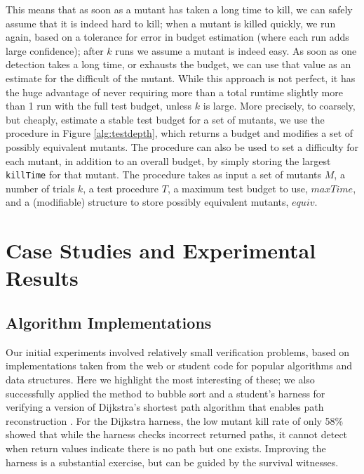 \documentclass{svjour3}
\begin{document}
This means that as soon as a mutant has taken a long time to kill, we
can safely assume that it is indeed hard to kill; when a mutant is killed
quickly, we run again, based on a tolerance for error in budget
estimation (where each run adds large confidence); after $k$ runs we
assume a mutant is indeed easy.  As soon as one
detection takes a long time, or exhausts the budget, we can use that
value as an estimate for the difficult of the mutant.  While this
approach is not perfect, it has the huge advantage of never requiring
more than a total runtime slightly more than 1 run with the full test
budget, unless $k$ is large.  More precisely, to coarsely, but
cheaply, estimate a stable test
budget for a set of mutants, we use the procedure in Figure
\ref{alg:testdepth}, which returns a budget and modifies a set of
possibly equivalent mutants.  The procedure can also be used to set a
difficulty for each mutant, in addition to an overall budget, by simply storing the largest {\tt
  killTime} for that mutant.  The procedure takes as input a set of
mutants $M$, a number of trials $k$, a test procedure $T$, a maximum
test budget to use, $maxTime$, and a (modifiable) structure to store
possibly equivalent mutants, $equiv$.





\section{Case Studies and Experimental Results}

\subsection{Algorithm Implementations}

Our initial experiments involved relatively small verification
problems, based on implementations taken from the web or student code for popular
algorithms and data structures.  Here we highlight the most
interesting of these; we also successfully applied the method to
bubble sort and a student's harness for verifying a version of Dijkstra's
shortest path algorithm that enables path reconstruction \cite{dijkstrasp}.  For the Dijkstra
harness, the low mutant kill rate of only 58\% showed that while the
harness checks incorrect returned paths, it cannot detect when return
values indicate there is no path but one exists.  Improving the
harness is a substantial exercise, but can be guided by the survival witnesses.
\end{document}
